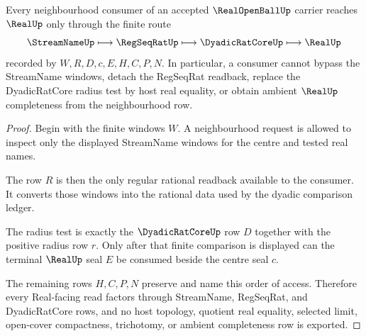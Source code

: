 \begin{theorem}
\label{thm:real-open-ball-streamname-real-handoff}
Every neighbourhood consumer of an accepted $\RealOpenBallUp$ carrier reaches $\RealUp$ only through the finite route
$$
\StreamNameUp \longmapsto \RegSeqRatUp \longmapsto \DyadicRatCoreUp \longmapsto \RealUp
$$
recorded by $W,R,D,c,E,H,C,P,N$. In particular, a consumer cannot bypass the StreamName windows, detach the RegSeqRat readback, replace the DyadicRatCore radius test by host real equality, or obtain ambient $\RealUp$ completeness from the neighbourhood row.
\end{theorem}
\begin{proof}
Begin with the finite windows $W$. A neighbourhood request is allowed to inspect only the displayed StreamName windows for the centre and tested real names.

The row $R$ is then the only regular rational readback available to the consumer. It converts those windows into the rational data used by the dyadic comparison ledger.

The radius test is exactly the $\DyadicRatCoreUp$ row $D$ together with the positive radius row $r$. Only after that finite comparison is displayed can the terminal $\RealUp$ seal $E$ be consumed beside the centre seal $c$.

The remaining rows $H,C,P,N$ preserve and name this order of access. Therefore every Real-facing read factors through StreamName, RegSeqRat, and DyadicRatCore rows, and no host topology, quotient real equality, selected limit, open-cover compactness, trichotomy, or ambient completeness row is exported.
\end{proof}


\begin{closurestatus}{\RealOpenBallUp}
  \theoryclosure{\seedClosure}
  \formalstatus{\unformalizedV}
\end{closurestatus}
